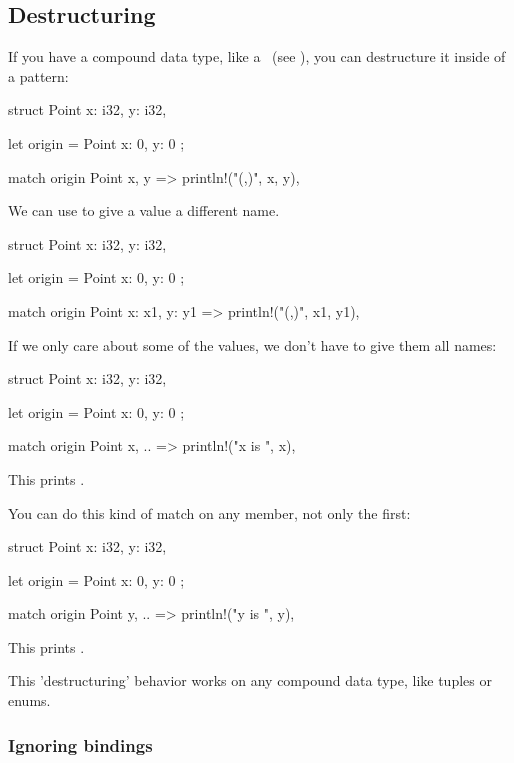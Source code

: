 \subsection*{Destructuring}

If you have a compound data type, like a \struct\ (see ), you can destructure it inside of a pattern:

\begin{rustc}
struct Point {
    x: i32,
    y: i32,
}

let origin = Point { x: 0, y: 0 };

match origin {
    Point { x, y } => println!("({},{})", x, y),
}
\end{rustc}

We can use \code{:} to give a value a different name.

\begin{rustc}
struct Point {
    x: i32,
    y: i32,
}

let origin = Point { x: 0, y: 0 };

match origin {
    Point { x: x1, y: y1 } => println!("({},{})", x1, y1),
}
\end{rustc}

If we only care about some of the values, we don't have to give them all names:

\begin{rustc}
struct Point {
    x: i32,
    y: i32,
}

let origin = Point { x: 0, y: 0 };

match origin {
    Point { x, .. } => println!("x is {}", x),
}
\end{rustc}

This prints .

You can do this kind of match on any member, not only the first:

\begin{rustc}
struct Point {
    x: i32,
    y: i32,
}

let origin = Point { x: 0, y: 0 };

match origin {
    Point { y, .. } => println!("y is {}", y),
}
\end{rustc}

This prints .

\blank

This 'destructuring' behavior works on any compound data type, like tuples or enums.

\subsubsection*{Ignoring bindings}

